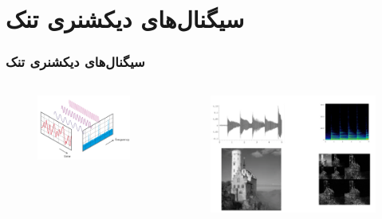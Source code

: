 \section{سیگنال‌های دیکشنری تنک\hfill}
\begin{frame}
\frametitle{سیگنال‌های دیکشنری تنک}
\begin{columns}
\begin{figure}
\centering
\includegraphics[scale=0.35]{Images/DS.png}
\end{figure}
\begin{figure}
\centering
\includegraphics[scale=0.15]{Images/DS1.png}
\end{figure}
\end{columns}
\end{frame}
